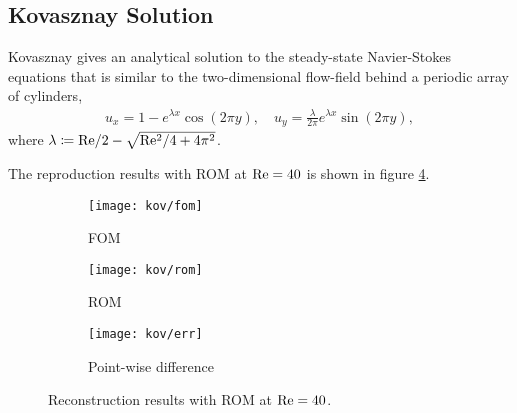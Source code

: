 \subsection{Kovasznay Solution}
Kovasznay gives an analytical solution to the steady-state Navier-Stokes
equations that is similar to the two-dimensional flow-field behind a periodic
array of cylinders,
\begin{align}
   u_x = 1-e^{\lambda x} \cos(2 \pi y), \quad u_y = \frac{\lambda}{2\pi}
   e^{\lambda x} \sin(2 \pi y),
\end{align}
where $\lambda \coloneqq \rm Re/2 - \sqrt{\rm Re^2/4 + 4\pi^2}$. 

The reproduction results with ROM at $\rm Re=40$ is shown in figure \ref{fig:3}.
\begin{figure}[!h]
     \centering
     \begin{subfigure}[b]{0.3\textwidth}
         \centering
         \texttt{[image: kov/fom]}
         \caption{FOM}
         \label{fig:3_a}
     \end{subfigure}
     \begin{subfigure}[b]{0.3\textwidth}
         \centering
         \texttt{[image: kov/rom]}
         \caption{ROM}
         \label{fig:3_b}
     \end{subfigure}
     \begin{subfigure}[b]{0.3\textwidth}
         \centering
         \texttt{[image: kov/err]}
         \caption{Point-wise difference}
         \label{fig:3_c}
     \end{subfigure}
     \caption{Reconstruction results with ROM at $\rm Re=40$.} \label{fig:3}
\end{figure}

